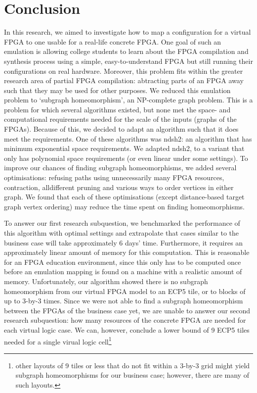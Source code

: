 \chapter{Conclusion}
\label{chapter:conclusion}
In this research, we aimed to investigate how to map a configuration for a virtual FPGA to one usable for a real-life concrete FPGA. One goal of such an emulation is allowing college students to learn about the FPGA compilation and synthesis process using a simple, easy-to-understand FPGA but still running their configurations on real hardware. Moreover, this problem fits within the greater research area of partial FPGA compilation: abtracting parts of an FPGA away such that they may be used for other purposes.  We reduced this emulation problem to `subgraph homeomorphism', an NP-complete graph problem. This is a problem for which several algorithms existed, but none met the space- and computational requirements needed for the scale of the inputs (graphs of the FPGAs). Because of this, we decided to adapt an algorithm such that it does meet the requirements. One of these algorithms was ndsh2: an algorithm that has minimum exponential space requirements. We adapted ndsh2, to a variant that only has polynomial space requirements (or even linear under some settings). To improve our chances of finding subgraph homeomorphisms, we added several optimisations: refusing paths using unnecessarily many FPGA resources, contraction, alldifferent pruning and various ways to order vertices in either graph. We found that each of these optimisations (except distance-based target graph vertex ordering) may reduce the time spent on finding homeomorphisms.

To answer our first research subquestion, we benchmarked the performance of this algorithm with optimal settings and extrapolate that cases similar to the business case will take approximately 6 days' time. Furthermore, it requires an approximately linear amount of memory for this computation. This is reasonable for an FPGA education environment, since this only has to be computed once before an emulation mapping is found on a machine with a realistic amount of memory. Unfortunately, our algorithm showed there is no subgraph homeomorphism from our virtual FPGA model to an ECP5 tile, or to blocks of up to 3-by-3 times. Since we were not able to find a subgraph homeomorphism between the FPGAs of the business case yet, we are unable to answer our second research subquestion: how many resources of the concrete FPGA are needed for each virtual logic case. We can, however, conclude a lower bound of 9 ECP5 tiles needed for a single virual logic cell\footnote{other layouts of 9 tiles or less that do not fit within a 3-by-3 grid might yield subgraph homeomorphisms for our business case; however, there are many of such layouts.}

